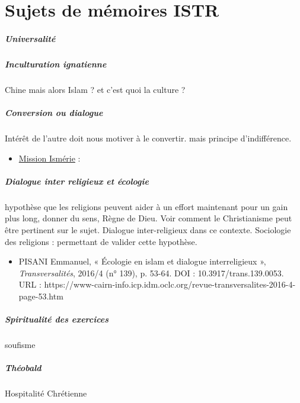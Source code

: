 \chapter{Sujets de mémoires ISTR}

\paragraph{Universalité}

\paragraph{Inculturation ignatienne} Chine mais alors Islam ? et c'est quoi la culture ?

\paragraph{Conversion ou dialogue} Intérêt de l'autre doit nous motiver à le convertir. mais principe d'indifférence. 
\begin{itemize}
    \item \href{https://mission-ismerie.com/}{Mission Ismérie}  : 
\end{itemize}

\paragraph{Dialogue inter religieux et écologie} hypothèse que les religions peuvent aider à un effort maintenant pour un gain plus long, donner du sens, Règne de Dieu. Voir comment le Christianisme peut être pertinent sur le sujet.
Dialogue inter-religieux dans ce contexte. Sociologie des religions : permettant de valider cette hypothèse.


\begin{itemize}
    \item PISANI Emmanuel, « Écologie en islam et dialogue interreligieux », \textit{Transversalités}, 2016/4 (n° 139), p. 53-64. DOI : 10.3917/trans.139.0053. URL : https://www-cairn-info.icp.idm.oclc.org/revue-transversalites-2016-4-page-53.htm 
    
\end{itemize}
\paragraph{Spiritualité des exercices} soufisme

\paragraph{Théobald} Hospitalité Chrétienne

